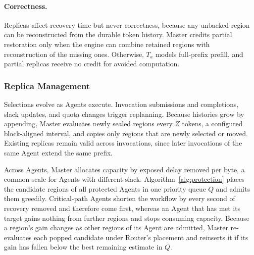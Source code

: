 \paragraph{Correctness.}
Replicas affect recovery time but never correctness, because any unbacked
region can be reconstructed from the durable token history. Master
credits partial restoration only when the engine can combine retained
regions with reconstruction of the missing ones. Otherwise, $T_a$ models
full-prefix prefill, and partial replicas receive no credit for avoided
computation.

\subsubsection{Replica Management}
\label{sec:master-online}
\label{sec:execution}

Selections evolve as Agents execute. Invocation submissions and
completions, slack updates, and quota changes trigger replanning.
Because histories grow by appending, Master evaluates newly sealed
regions every $Z$ tokens, a configured block-aligned interval, and
copies only regions that are newly selected or moved. Existing replicas
remain valid across invocations, since later invocations of the same
Agent extend the same prefix.

Across Agents, Master allocates capacity by exposed delay removed per
byte, a common scale for Agents with different slack.
Algorithm~\ref{alg:protection} places the candidate regions of all
protected Agents in one priority queue $Q$ and admits them greedily.
Critical-path Agents shorten the workflow by every second of recovery
removed and therefore come first, whereas an Agent that has met its
target gains nothing from further regions and stops consuming capacity.
Because a region's gain changes as other regions of its Agent are
admitted, Master re-evaluates each popped candidate under Router's
placement and reinserts it if its gain has fallen below the best
remaining estimate in $Q$.

